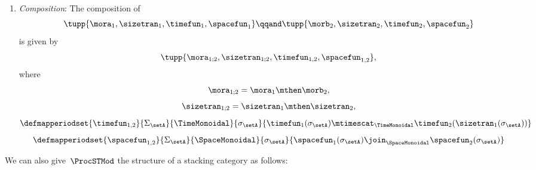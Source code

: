 \begin{definition}
\begin{enumerate}
        \item \emph{Composition}: The composition of
              \begin{equation}
                  \tupp{\mora_1, \sizetran_1,  \timefun_1 , \spacefun_1 }
                  \qqand
                  \tupp{\morb_2, \sizetran_2,  \timefun_2 , \spacefun_2 }
              \end{equation}
              is given by
              \begin{equation}
                  \tupp{
                      \mora_{1;2},
                      \sizetran_{1;2},
                      \timefun_{1,2},
                      \spacefun_{1,2}
                  },
              \end{equation}
              where
              \begin{equation}
                  \mora_{1;2} = \mora_1 \mthen \morb_2,
              \end{equation}
              \begin{equation}
                  \sizetran_{1;2} = \sizetran_1 \mthen \sizetran_2,
              \end{equation}
              \begin{equation}
                  \defmapperiodset{
                      \timefun_{1,2}
                  }{
                      \Sigma_{\setA}
                  }{
                      \TimeMonoidal
                  }{
                      \sigma_{\setA}
                  }{
                      \timefun_1(\sigma_{\setA}) \mtimescat_{\TimeMonoidal} \timefun_2(\sizetran_1(\sigma_{\setA}))
                  }
              \end{equation}
              \begin{equation}
                  \defmapperiodset{
                      \spacefun_{1,2}
                  }{
                      \Sigma_{\setA}
                  }{
                      \SpaceMonoidal
                  }{
                      \sigma_{\setA}
                  }{
                      \spacefun_1(\sigma_{\setA}) \join_{\SpaceMonoidal} \spacefun_2(\sigma_{\setA})
                  }
              \end{equation}
    \end{enumerate}
\end{definition}

We can also give~$\ProcSTMod$ the structure of a stacking category as follows:

